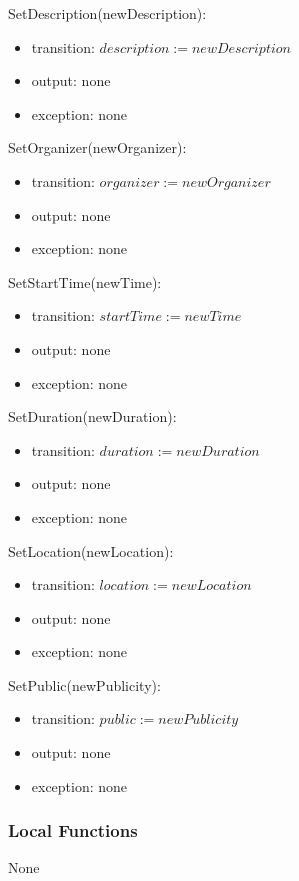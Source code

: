 \documentclass[12pt, titlepage]{article}
\begin{document}
\noindent SetDescription(newDescription):
\begin{itemize}
\item transition: $description := newDescription$
\item output: none
\item exception: none
\end{itemize}

\noindent SetOrganizer(newOrganizer):
\begin{itemize}
\item transition: $organizer := newOrganizer$
\item output: none
\item exception: none
\end{itemize}

\noindent SetStartTime(newTime):
\begin{itemize}
\item transition: $startTime := newTime$
\item output: none
\item exception: none
\end{itemize}

\noindent SetDuration(newDuration):
\begin{itemize}
\item transition: $duration := newDuration$
\item output: none
\item exception: none
\end{itemize}

\noindent SetLocation(newLocation):
\begin{itemize}
\item transition: $location := newLocation$
\item output: none
\item exception: none
\end{itemize}

\noindent SetPublic(newPublicity):
\begin{itemize}
\item transition: $public := newPublicity$
\item output: none
\item exception: none
\end{itemize}
\subsubsection{Local Functions}

None

\newpage
\end{document}

